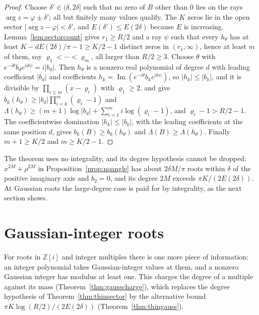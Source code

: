 \documentclass[11pt]{article}
\begin{document}
\begin{proof}
Choose $\delta'\in(\delta,2\delta]$ such that no zero of $B$ other than $0$ lies on the rays
$\arg z=\varphi\pm\delta'$; all but finitely many values qualify.  The $K$
zeros lie in the open sector $|\arg z-\varphi|<\delta'$, and $E(\delta')\le
E(2\delta)$ because $E$ is increasing.  Lemma~\ref{lem:sectorcount} gives
$r_1\ge R/2$ and a ray $\psi$ such that every $h_\theta$ has at least
$K-dE(2\delta)/\pi-1\ge K/2-1$ distinct zeros in $(r_1,\infty)$, hence at least
$m$ of them, say $\varrho_1<\cdots<\varrho_m$, all larger than $R/2\ge3$.
Choose $\theta$ with $e^{-i\theta}b_de^{id\psi}=i|b_d|$.  Then $h_\theta$ is a
nonzero real polynomial of degree $d$ with leading coefficient $|b_d|$ and
coefficients $h_k=\operatorname{Im}(e^{-i\theta}b_ke^{ik\psi})$, so
$|h_k|\le|b_k|$, and it is divisible by $\prod_{i\le m}(x-\varrho_i)$ with
$\varrho_1\ge2$.  \cite[Theorem~3.2]{coefficient-mass} and \cite[Corollary~3.4]{coefficient-mass} give
$b_k(h_\theta)\ge|b_d|\prod_{i=k}^m(\varrho_i-1)$ and
$\Lambda(h_\theta)\ge(m+1)\log|b_d|+\sum_{i=1}^mi\log(\varrho_i-1)$, and
$\varrho_i-1>R/2-1$.  The coefficientwise domination $|h_k|\le|b_k|$, with the
leading coefficients at the same position $d$, gives $b_k(B)\ge b_k(h_\theta)$
and $\Lambda(B)\ge\Lambda(h_\theta)$.  Finally $m+1\ge K/2$ and $m\ge K/2-1$.
\end{proof}

The theorem uses no integrality, and its degree hypothesis cannot be
dropped: $x^{2M}+\rho^{2M}$ in Proposition~\ref{prop:noangle} has about
$2\delta M/\pi$ roots within $\delta$ of the positive imaginary axis and
$b_2=0$, and its degree $2M$ exceeds $\pi K/(2E(2\delta))$.  At Gaussian roots
the large-degree case is paid for by integrality, as the next section shows.


\section{Gaussian-integer roots}\label{sec:gaussian}

For roots in $\mathbb Z[i]$ and integer multiples there is one more piece of
information: an integer polynomial takes Gaussian-integer values at them,
and a nonzero Gaussian integer has modulus at least one.  This charges the
degree of a multiple against its mass (Theorem~\ref{thm:gausscharge}), which
replaces the degree hypothesis of Theorem~\ref{thm:thinsector} by the
alternative bound $\pi K\log(R/2)/(2E(2\delta))$ (Theorem~\ref{thm:thingauss}).
\end{document}
